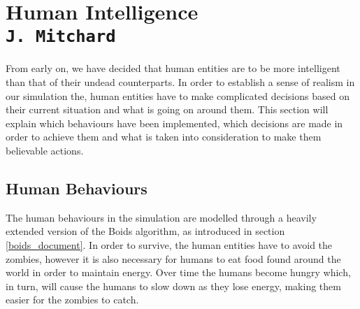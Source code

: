 \pagestyle{empty}



\section{Human Intelligence\\{\small\tt J.~Mitchard}}
\label{human_doc}
From early on, we have decided that human entities are to be more intelligent than that of their undead counterparts. In order to establish a sense of realism in our simulation the, human entities have to make complicated decisions based on their current situation and what is going on around them. This section will explain which behaviours have been implemented, which decisions are made in order to achieve them and what is taken into consideration to make them believable actions.

\subsection{Human Behaviours}
The human behaviours in the simulation are modelled through a heavily extended version of the Boids algorithm, as introduced in section \ref{boids_document}. In order to survive, the human entities have to avoid the zombies, however it is also necessary for humans to eat food found around the world in order to maintain energy. Over time the humans become hungry which, in turn, will cause the humans to slow down as they lose energy, making them easier for the zombies to catch.


